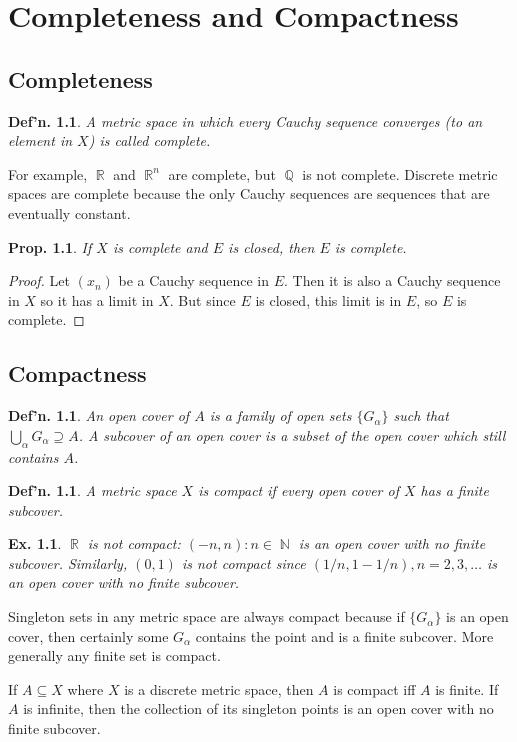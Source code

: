 \documentclass[12pt, a4paper]{book}
\DeclareMathOperator{\N}{\mathbb{N}}
\DeclareMathOperator{\Q}{\mathbb{Q}}
\DeclareMathOperator{\R}{\mathbb{R}}
\newtheorem{definition}[theorem]{Def'n.}
\newtheorem{proposition}[theorem]{Prop.}
\newtheorem{example}[theorem]{Ex.}
\theoremstyle{nonumberplain}
\newtheorem{proof}{Proof}
\begin{document}
\chapter{Completeness and Compactness}
\section{Completeness}
\begin{definition}
    A metric space in which every Cauchy sequence converges (to an element in $X$) is called \textit{complete}.
\end{definition}
For example, $\R$ and $\R^n$ are complete, but $\Q$ is not complete. Discrete metric spaces are complete because the
only Cauchy sequences are sequences that are eventually constant.
\begin{proposition}
    If $X$ is complete and $E$ is closed, then $E$ is complete.
\end{proposition}
\begin{proof}
    Let $(x_n)$ be a Cauchy sequence in $E$. Then it is also a Cauchy sequence in $X$ so it has a limit in $X$. But since $E$
    is closed, this limit is in $E$, so $E$ is complete.
\end{proof}
\section{Compactness}
\begin{definition}
    An \textit{open cover} of $A$ is a family of open sets $\{G_\alpha\}$ such that $\bigcup_\alpha G_\alpha\supseteq A$.
    A subcover of an open cover is a subset of the open cover which still contains $A$.
\end{definition}
\begin{definition}
    A metric space $X$ is \textit{compact} if every open cover of $X$ has a finite subcover.
\end{definition}
\begin{example}
    $\R$ is not compact: $(-n,n):n\in\N$ is an open cover with no finite subcover. Similarly, $(0,1)$ is not compact
    since $(1/n,1-1/n),n=2,3,\ldots$ is an open cover with no finite subcover.
\end{example}
Singleton sets in any metric space are always compact because if $\{G_\alpha\}$ is an open cover, then certainly
some $G_\alpha$ contains the point and is a finite subcover. More generally any finite set is compact.

If $A\subseteq X$ where $X$ is a discrete metric space, then $A$ is compact iff $A$ is finite. If $A$ is infinite, then
the collection of its singleton points is an open cover with no finite subcover.
\end{document}
